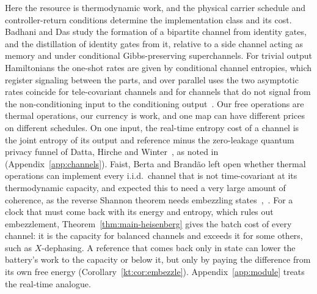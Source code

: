 Here the resource is thermodynamic work, and the physical carrier schedule and controller-return conditions determine the implementation class and its cost. Badhani and Das study the formation of a bipartite channel from identity gates, and the distillation of identity gates from it, relative to a side channel acting as memory and under conditional Gibbs-preserving superchannels. For trivial output Hamiltonians the one-shot rates are given by conditional channel entropies, which register signaling between the parts, and over parallel uses the two asymptotic rates coincide for tele-covariant channels and for channels that do not signal from the non-conditioning input to the conditioning output~\cite{BadhaniDas26}. Our free operations are thermal operations, our currency is work, and one map can have different prices on different schedules. On one input, the real-time entropy cost of a channel is the joint entropy of its output and reference minus the zero-leakage quantum privacy funnel of Datta, Hirche and Winter~\cite{DattaHircheWinter19}, as noted in~\cite{Douglas26closed} (Appendix~\ref{app:channels}). Faist, Berta and Brand\~ao left open whether thermal operations can implement every i.i.d.\ channel that is not time-covariant at its thermodynamic capacity, and expected this to need a very large amount of coherence, as the reverse Shannon theorem needs embezzling states~\cite{FBB19},~\cite[Sec.~9]{FBB21}. For a clock that must come back with its energy and entropy, which rules out embezzlement, Theorem~\ref{thm:main-heisenberg} gives the batch cost of every channel: it is the capacity for balanced channels and exceeds it for some others, such as $X$-dephasing. A reference that comes back only in state can lower the battery's work to the capacity or below it, but only by paying the difference from its own free energy (Corollary~\ref{kt:cor:embezzle}). Appendix~\ref{app:module} treats the real-time analogue.

